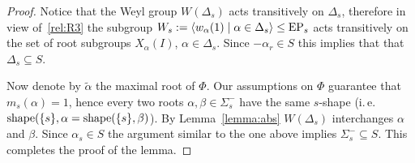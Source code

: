 \begin{proof}
Notice that the Weyl group $W(\Delta_s)$ acts transitively on $\Delta_s$, therefore in view of~\ref{rel:R3} the subgroup
$W_s := \langle w_\alpha(1) \mid \alpha\in\Delta_s\rangle \leq \operatorname{EP}_s$ acts transitively on the set of root subgroups $X_\alpha(I)$, $\alpha\in \Delta_s$.
Since $-\alpha_r\in S$ this implies that that $\Delta_s\subseteq S$.

Now denote by $\widetilde{\alpha}$ the maximal root of $\Phi$. Our assumptions on $\Phi$ guarantee that $m_s(\alpha)=1$, 
hence every two roots $\alpha, \beta \in \Sigma^-_s$ have the same $s$-shape (i.\,e. $\operatorname{shape}(\{s\}, \alpha = \operatorname{shape}(\{s\}, \beta)$).
By Lemma~\ref{lemma:abs} $W(\Delta_s)$ interchanges $\alpha$ and $\beta$. %
Since $\alpha_s \in S$ the argument similar to the one above implies $\Sigma^-_s\subseteq S$. This completes the proof of the lemma. \end{proof}